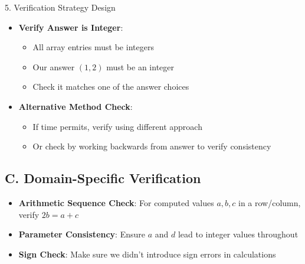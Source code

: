 \documentclass[12pt]{article}
\begin{document}
\begin{verificationbox}{5. Verification Strategy Design}
\begin{itemize}[leftmargin=*]
    \item \textbf{Verify Answer is Integer}:
    \begin{itemize}
        \item All array entries must be integers
        \item Our answer $(1,2)$ must be an integer
        \item Check it matches one of the answer choices
    \end{itemize}
    
    \item \textbf{Alternative Method Check}:
    \begin{itemize}
        \item If time permits, verify using different approach
        \item Or check by working backwards from answer to verify consistency
    \end{itemize}
\end{itemize}

\subsection*{C. Domain-Specific Verification}
\begin{itemize}[leftmargin=*]
    \item \textbf{Arithmetic Sequence Check}: For computed values $a, b, c$ in a row/column, verify $2b = a + c$
    \item \textbf{Parameter Consistency}: Ensure $a$ and $d$ lead to integer values throughout
    \item \textbf{Sign Check}: Make sure we didn't introduce sign errors in calculations
\end{itemize}

\end{verificationbox}
\end{document}
